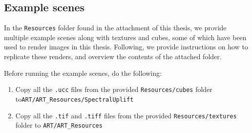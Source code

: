 \subsection{Example scenes}

In the \texttt{Resources} folder found in the attachment of this thesis, we provide multiple example scenes along with textures and cubes, some of which have been used to render images in this thesis. Following, we provide instructions on how to replicate these renders, and overview the contents of the attached folder.

Before running the example scenes, do the following:
\begin{enumerate}
	\item Copy all the \texttt{.ucc} files from the provided \texttt{Resources/cubes} folder to\newline \texttt{ART/ART\_Resources/SpectralUplift}
	
	\item Copy all the \texttt{.tif} and \texttt{.tiff} files from the provided \texttt{Resources/textures} folder to \texttt{ART/ART\_Resources} 
\end{enumerate}

